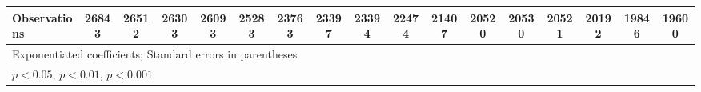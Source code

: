 {\begin{tabular}{l*{16}{c}}
\hline
Observations        &       26843         &       26512         &       26303         &       26093         &       25283         &       23763         &       23397         &       23394         &       22474         &       21407         &       20520         &       20530         &       20521         &       20192         &       19846         &       19600         \\
\hline\hline
\multicolumn{17}{l}{\footnotesize Exponentiated coefficients; Standard errors in parentheses}\\
\multicolumn{17}{l}{\footnotesize \sym{*} \(p<0.05\), \sym{**} \(p<0.01\), \sym{***} \(p<0.001\)}\\
\end{tabular}
}
